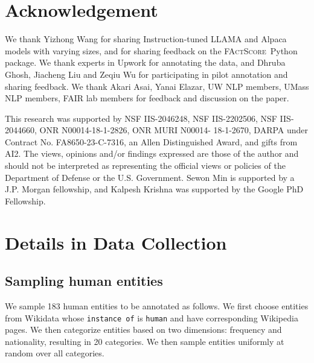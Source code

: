 \documentclass[11pt]{article}
\newcommand{\ours}{\textsc{FActScore}}
\begin{document}


\section*{Acknowledgement}
We thank Yizhong Wang for sharing Instruction-tuned LLAMA and Alpaca models with varying sizes, and for sharing feedback on the \ours\ Python package. We thank experts in Upwork for annotating the data, and Dhruba Ghosh, Jiacheng Liu and Zeqiu Wu for participating in pilot annotation and sharing feedback. We thank Akari Asai, Yanai Elazar, UW NLP members, UMass NLP members, FAIR lab members for feedback and discussion on the paper.

This research was supported by
NSF IIS-2046248, NSF IIS-2202506, NSF IIS-2044660, ONR N00014-18-1-2826, ONR MURI N00014- 18-1-2670, DARPA under Contract No. FA8650-23-C-7316, an Allen Distinguished Award, and gifts from AI2.
The views, opinions and/or findings expressed are those of the author and should not be interpreted as representing the official views or policies of the Department of Defense or the U.S. Government.
Sewon Min is supported by a J.P. Morgan fellowship, and Kalpesh Krishna was supported by the Google PhD Fellowship.





\clearpage
\appendix

\section{Details in Data Collection}\label{app:data-details}

\subsection{Sampling human entities}\label{app:data-category}

We sample 183 human entities to be annotated as follows. We first choose entities from Wikidata whose \texttt{instance of} is \texttt{human} and have corresponding Wikipedia pages.
We then categorize entities based on two dimensions: frequency and nationality, resulting in 20 categories. We then sample entities uniformly at random over all categories.

\vspace{-.2em}
\end{document}
